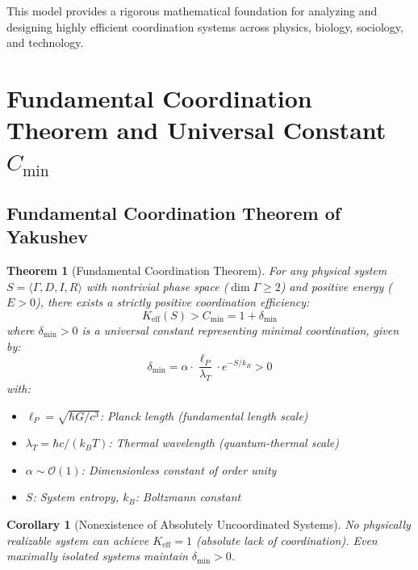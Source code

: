 \documentclass[11pt,a4paper]{article}
\newtheorem{theorem}{Theorem}
\newtheorem{corollary}{Corollary}
\begin{document}
This model provides a rigorous mathematical foundation for analyzing and designing highly efficient coordination systems across physics, biology, sociology, and technology.


\section{Fundamental Coordination Theorem and Universal Constant \texorpdfstring{$C_{\min}$}{C\_min}}
\label{sec:fundamental-theorem}

\subsection{Fundamental Coordination Theorem of Yakushev}

\begin{theorem}[Fundamental Coordination Theorem]
	For any physical system $S = \langle \Gamma, D, I, R \rangle$ with nontrivial phase space ($\dim\Gamma \geq 2$) and positive energy ($E > 0$), there exists a strictly positive coordination efficiency:
	\begin{equation}
		\boxed{K_{\mathrm{eff}}(S) > C_{\min} = 1 + \delta_{\min}}
	\end{equation}
	where $\delta_{\min} > 0$ is a universal constant representing minimal coordination, given by:
	\begin{equation}
		\delta_{\min} = \alpha \cdot \frac{\ell_P}{\lambda_T} \cdot e^{-S/k_B} > 0
	\end{equation}
	with:
	\begin{itemize}
		\item $\ell_P = \sqrt{\hbar G/c^3}$: Planck length (fundamental length scale)
		\item $\lambda_T = \hbar c/(k_B T)$: Thermal wavelength (quantum-thermal scale)
		\item $\alpha \sim \mathcal{O}(1)$: Dimensionless constant of order unity
		\item $S$: System entropy, $k_B$: Boltzmann constant
	\end{itemize}
\end{theorem}

\begin{corollary}[Nonexistence of Absolutely Uncoordinated Systems]
	No physically realizable system can achieve $K_{\mathrm{eff}} = 1$ (absolute lack of coordination). Even maximally isolated systems maintain $\delta_{\min} > 0$.
\end{corollary}
\end{document}
